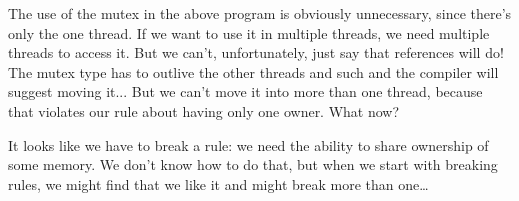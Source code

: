 The use of the mutex in the above program is obviously unnecessary, since there's only the one thread. If we want to use it in multiple threads, we need multiple threads to access it. But we can't, unfortunately, just say that references will do! The mutex type has to outlive the other threads and such and the compiler will suggest moving it... But we can't move it into more than one thread, because that violates our rule about having only one owner. What now?

It looks like we have to break a rule: we need the ability to share ownership of some memory. We don't know how to do that, but when we start with breaking rules, we might find that we like it and might break more than one\ldots





